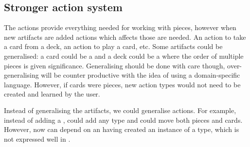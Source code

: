 \subsection{Stronger action system}
\label{sec:strongeractionsystem}

The actions provide everything needed for working with pieces, however when new
artifacts are added actions which affects those are needed. An action to take a
card from a deck, an action to play a card, etc. Some artifacts could be
generalised: a card could be a  and a deck could be a 
where the order of multiple pieces is given significance. Generalising should be
done with care though, over-generalising will be counter productive with the
idea of using a domain-specific language. However, if cards were pieces, new
action types would not need to be created and learned by the user.

Instead of generalising the artifacts, we could generalise actions. For example,
instead of  adding a ,  could add
any type and  could move both pieces and cards. However, now
 can depend on an  having created an instance
of a type, which is not expressed well in .

